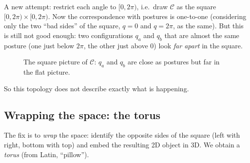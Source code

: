 \documentclass[11pt,a4paper]{article}
\newcommand{\C}{\mathcal{C}}
\theoremstyle{definition}
\theoremstyle{plain}
\theoremstyle{remark}
\begin{document}
A new attempt: restrict each angle to $[0,2\pi)$, i.e.\ draw $\C$ as the square $[0,2\pi)\times[0,2\pi)$. Now the correspondence with postures is one-to-one (considering only the two ``bad sides'' of the square, $q=0$ and $q=2\pi$, as the same). But this is still not good enough: two configurations $q_a$ and $q_b$ that are almost the same posture (one just below $2\pi$, the other just above $0$) look \emph{far apart} in the square.

\begin{figure}[ht]
\centering
{}
\caption{The square picture of $\C$: $q_a$ and $q_b$ are close as postures but far in the flat picture.}
\end{figure}

So this topology does not describe exactly what is happening.

\subsection{Wrapping the space: the torus}

The fix is to \emph{wrap} the space: identify the opposite sides of the square (left with right, bottom with top) and embed the resulting 2D object in 3D. We obtain a \emph{torus} (from Latin, ``pillow'').
\end{document}
